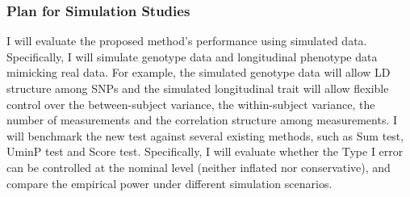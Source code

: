 \documentclass[12pt]{article}
\begin{document}
\subsubsection{Plan for Simulation Studies}\label{sec:aim1a-PSS}
I will evaluate the proposed method's performance using simulated data. Specifically, I will simulate genotype data and longitudinal phenotype data mimicking real data. For example, the simulated genotype data will allow LD structure among SNPs and the simulated longitudinal trait will allow flexible control over the between-subject variance, the within-subject variance, the number of measurements and the correlation structure among measurements. I will benchmark the new test against several existing methods, such as Sum test, UminP test and Score test. Specifically, I will evaluate whether the Type I error can be controlled at the nominal level (neither inflated nor conservative), and compare the empirical power under different simulation scenarios.

\end{document}
